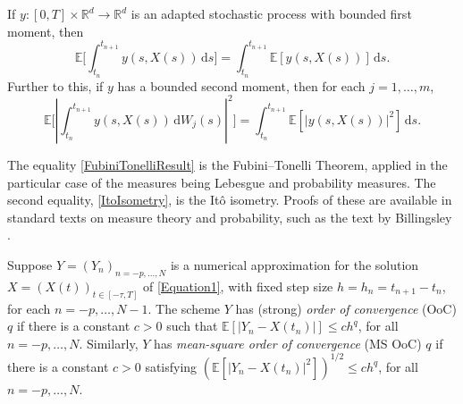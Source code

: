 \documentclass[onefignum]{siamart250211}
\providecommand{\abs}[1]{\left|#1\right|}
\begin{document}




\begin{theorem}\label{FubiniTonelliIto}
If $y:[0,T]\times\mathbb{R}^d\to\mathbb{R}^d$ is an adapted stochastic process with bounded first moment, then
\begin{equation}\mathbb{E}\bigg[\int_{t_n}^{t_{n+1}}y(s,X(s))\,\mathrm{d}s\bigg]=\int_{t_n}^{t_{n+1}}\mathbb{E}[y(s,X(s))]\,\mathrm{d}s.\label{FubiniTonelliResult}\end{equation}
Further to this, if $y$ has a bounded second moment, then for each $j=1,\ldots,m$,
\begin{equation}\mathbb{E}\bigg[\abs{\int_{t_n}^{t_{n+1}}y(s,X(s))\,\mathrm{d}W_j(s)}^2\bigg]=\int_{t_n}^{t_{n+1}}\mathbb{E}\left[\abs{y(s,X(s))}^2\right]\,\mathrm{d}s.\label{ItoIsometry}\end{equation}
\end{theorem}

The equality \cref{FubiniTonelliResult} is the Fubini--Tonelli Theorem, applied in the particular case of the measures being Lebesgue and probability measures. The second equality, \cref{ItoIsometry}, is the It\^o isometry. Proofs of these are available in standard texts on measure theory and probability, such as the text by Billingsley \cite{Billingsley1995}.

\begin{definition}
Suppose $Y=(Y_n)_{n=-p,\ldots,N}$ is a numerical approximation for the solution $X=(X(t))_{t\in[-\tau,T]}$ of \cref{Equation1}, with fixed step size $h=h_n=t_{n+1}-t_n$, for each $n=-p,\ldots,N-1$. The scheme $Y$ has (strong) \emph{order of convergence} (OoC) $q$ if there is a constant $c>0$ such that $\mathbb{E}\left[\abs{Y_n-X(t_n)}\right]\leqslant ch^q$, for all $n=-p,\ldots,N$. Similarly, $Y$ has \emph{mean-square order of convergence} (MS OoC) $q$ if there is a constant $c>0$ satisfying $\left(\mathbb{E}\left[\abs{Y_n-X(t_n)}^2\right]\right)^{1/2}\leqslant ch^q$, for all $n=-p,\ldots,N$.
\end{definition}
\end{document}
